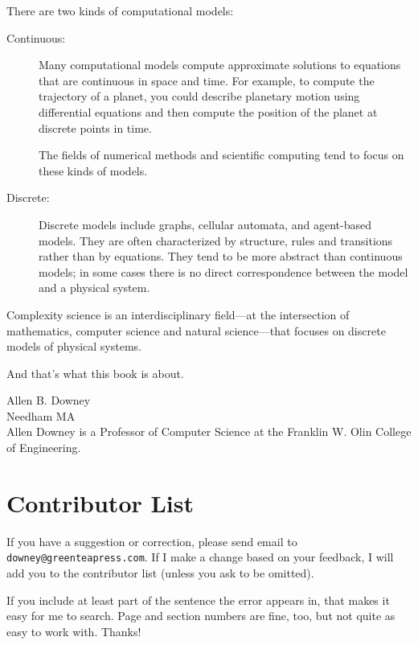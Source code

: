 \documentclass[10pt]{book}
\begin{document}
There are two kinds of computational models:

\begin{description}

\item[Continuous:] Many computational models compute approximate
  solutions to equations that are continuous in space and time.  For
  example, to compute the trajectory of a planet, you could describe
  planetary motion using differential equations and then compute the
  position of the planet at discrete points in time.

The fields of numerical methods and scientific computing
tend to focus on these kinds of models.

\item[Discrete:] Discrete models include graphs, cellular automata,
  and agent-based models.  They are often characterized by structure,
  rules and transitions rather than by equations.  They tend to be
  more abstract than continuous models; in some cases there is no
  direct correspondence between the model and a physical system.

\end{description}

Complexity science is an interdisciplinary field---at the intersection
of mathematics, computer science and natural science---that focuses on
discrete models of physical systems.

And that's what this book is about.


Allen B. Downey \\
Needham MA\\

Allen Downey is a Professor of Computer Science at 
the Franklin W. Olin College of Engineering.




\section*{Contributor List}


If you have a suggestion or correction, please send email to 
{\tt downey@greenteapress.com}.  If I make a change based on your
feedback, I will add you to the contributor list
(unless you ask to be omitted).

If you include at least part of the sentence the
error appears in, that makes it easy for me to search.  Page and
section numbers are fine, too, but not quite as easy to work with.
Thanks!
\end{document}
